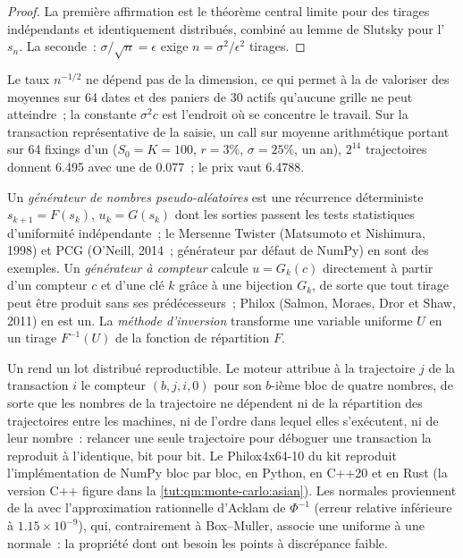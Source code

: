 \begin{proof}
La première affirmation est le théorème central limite pour des tirages indépendants et identiquement distribués, combiné au lemme de Slutsky pour l' $s_n$. La seconde~: $\sigma/\sqrt n = \epsilon$ exige $n =
\sigma^2/\epsilon^2$ tirages.
\end{proof}

Le taux $n^{-1/2}$ ne dépend pas de la dimension, ce qui permet à la  de valoriser des moyennes sur 64 dates et des paniers de 30 actifs qu'aucune grille ne peut atteindre~; la constante $\sigma^2c$ est l'endroit où se
concentre le travail. Sur la transaction représentative de la saisie, un call sur moyenne arithmétique portant sur 64 fixings d'un  ($S_0 = K = 100$, $r = 3\%$, $\sigma = 25\%$, un an), $2^{14}$ trajectoires donnent
6.495 avec une  de 0.077~; le prix vaut 6.4788.

\begin{definition}\label{def:qm:monte-carlo:prng}
Un \emph{générateur de nombres pseudo-aléatoires} est une récurrence déterministe $s_{k+1} = F(s_k)$, $u_k = G(s_k)$ dont les sorties passent les tests statistiques
d'uniformité indépendante~; le Mersenne Twister (Matsumoto et Nishimura, 1998) et PCG (O'Neill, 2014~; générateur par défaut de NumPy) en sont des exemples. Un \emph{générateur à compteur}
calcule $u = G_k(c)$ directement à partir d'un compteur $c$ et d'une clé $k$ grâce à une bijection $G_k$, de sorte que tout tirage peut être produit sans ses prédécesseurs~; Philox (Salmon, Moraes, Dror
et Shaw, 2011) en est un. La \emph{méthode d'inversion} transforme une variable uniforme $U$ en un tirage $F^{-1}(U)$ de la fonction de répartition $F$.
\end{definition}

Un  rend un lot distribué reproductible. Le moteur attribue à la trajectoire $j$ de la transaction $i$ le compteur $(b, j, i, 0)$ pour son $b$-ième bloc de quatre nombres, de sorte que
les nombres de la trajectoire ne dépendent ni de la répartition des trajectoires entre les machines, ni de l'ordre dans lequel elles s'exécutent, ni de leur nombre~: relancer une seule trajectoire pour déboguer une transaction la reproduit à l'identique, bit pour
bit. Le Philox4x64-10 du kit reproduit l'implémentation de NumPy bloc par bloc, en Python, en C++20 et en Rust (la version C++ figure dans la \cref{tut:qm:monte-carlo:asian}). Les normales proviennent de la  avec
l'approximation rationnelle d'Acklam de $\Phi^{-1}$ (erreur relative inférieure à $1.15 \times 10^{-9}$), qui, contrairement à Box--Muller, associe une uniforme à une normale~: la propriété dont ont besoin les points à discrépance faible.

